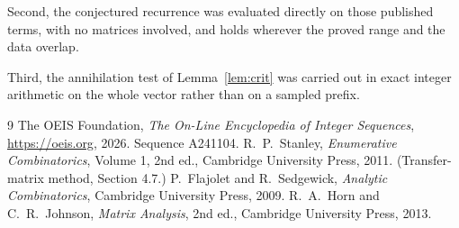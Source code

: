 \documentclass[11pt,a4paper]{article}
\theoremstyle{plain}
\theoremstyle{definition}
\begin{document}
Second, the conjectured recurrence was evaluated directly on those published terms, with no
matrices involved, and holds wherever the proved range and the data overlap.

Third, the annihilation test of Lemma~\ref{lem:crit} was carried out in exact integer
arithmetic on the whole vector rather than on a sampled prefix.

\begin{thebibliography}{9}
 The OEIS Foundation, \emph{The On-Line Encyclopedia of Integer
Sequences}, \url{https://oeis.org}, 2026. Sequence A241104.
 R.~P.~Stanley, \emph{Enumerative Combinatorics}, Volume 1, 2nd ed.,
Cambridge University Press, 2011. (Transfer-matrix method, Section 4.7.)
 P.~Flajolet and R.~Sedgewick, \emph{Analytic Combinatorics}, Cambridge
University Press, 2009.
 R.~A.~Horn and C.~R.~Johnson, \emph{Matrix Analysis}, 2nd ed., Cambridge
University Press, 2013.
\end{thebibliography}
\end{document}
